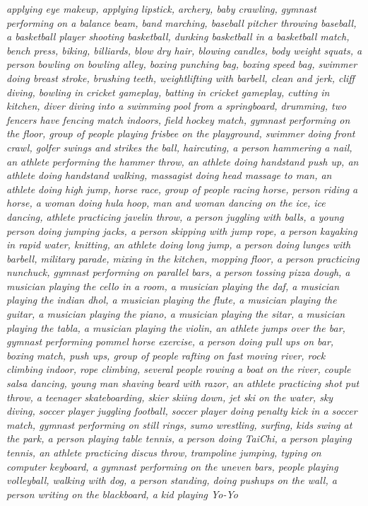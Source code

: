 \documentclass[10pt,twocolumn,letterpaper]{article}
\begin{document}
\textit{applying eye makeup, applying lipstick, archery, baby crawling, gymnast performing on a balance beam, band marching, baseball pitcher throwing baseball, a basketball player shooting basketball, dunking basketball in a basketball match, bench press, biking, billiards, blow dry hair, blowing candles, body weight squats, a person bowling on bowling alley, boxing punching bag, boxing speed bag, swimmer doing breast stroke, brushing teeth, weightlifting with barbell, clean and jerk, cliff diving, bowling in cricket gameplay, batting in cricket gameplay, cutting in kitchen, diver diving into a swimming pool from a springboard, drumming, two fencers have fencing match indoors, field hockey match, gymnast performing on the floor, group of people playing frisbee on the playground, swimmer doing front crawl, golfer swings and strikes the ball, haircuting, a person hammering a nail, an athlete performing the hammer throw, an athlete doing handstand push up, an athlete doing handstand walking, massagist doing head massage to man, an athlete doing high jump, horse race, group of people racing horse, person riding a horse, a woman doing hula hoop, man and woman dancing on the ice, ice dancing, athlete practicing javelin throw, a person juggling with balls, a young person doing jumping jacks, a person skipping with jump rope, a person kayaking in rapid water, knitting, an athlete doing long jump, a person doing lunges with barbell, military parade, mixing in the kitchen, mopping floor, a person practicing nunchuck, gymnast performing on parallel bars, a person tossing pizza dough, a musician playing the cello in a room, a musician playing the daf, a musician playing the indian dhol, a musician playing the flute, a musician playing the guitar, a musician playing the piano, a musician playing the sitar, a musician playing the tabla, a musician playing the violin, an athlete jumps over the bar, gymnast performing pommel horse exercise, a person doing pull ups on bar, boxing match, push ups, group of people rafting on fast moving river, rock climbing indoor, rope climbing, several people rowing a boat on the river, couple salsa dancing, young man shaving beard with razor, an athlete practicing shot put throw, a teenager skateboarding, skier skiing down, jet ski on the water, sky diving, soccer player juggling football, soccer player doing penalty kick in a soccer match, gymnast performing on still rings, sumo wrestling, surfing, kids swing at the park, a person playing table tennis, a person doing TaiChi, a person playing tennis, an athlete practicing discus throw, trampoline jumping, typing on computer keyboard, a gymnast performing on the uneven bars, people playing volleyball, walking with dog, a person standing, doing pushups on the wall, a person writing on the blackboard, a kid playing Yo-Yo}
\end{document}

